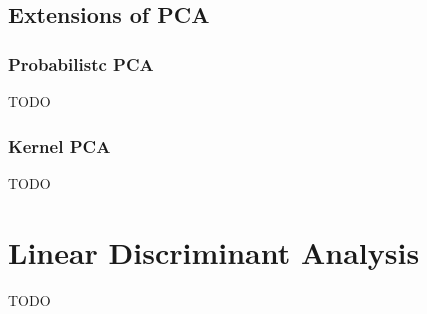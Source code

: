 \documentclass{article}
\begin{document}
    \subsection{Extensions of PCA}
        \subsubsection{Probabilistc PCA}
        TODO
        \subsubsection{Kernel PCA}
        TODO
\section{Linear Discriminant Analysis}
    TODO
\end{document}
